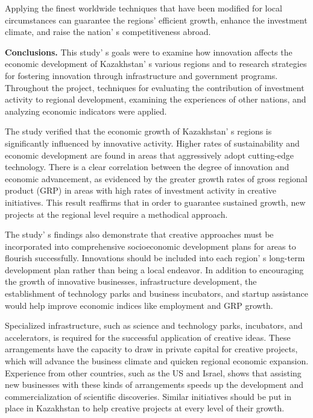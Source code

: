 \begin{multicols}{2}
Applying the finest worldwide techniques that have been modified for
local circumstances can guarantee the regions'{}
efficient growth, enhance the investment climate, and raise the
nation' s competitiveness abroad.

{\bfseries Conclusions.} This study' s goals were to examine
how innovation affects the economic development of
Kazakhstan' s various regions and to research strategies
for fostering innovation through infrastructure and government programs.
Throughout the project, techniques for evaluating the contribution of
investment activity to regional development, examining the experiences
of other nations, and analyzing economic indicators were applied.

The study verified that the economic growth of
Kazakhstan' s regions is significantly influenced by
innovative activity. Higher rates of sustainability and economic
development are found in areas that aggressively adopt cutting-edge
technology. There is a clear correlation between the degree of
innovation and economic advancement, as evidenced by the greater growth
rates of gross regional product (GRP) in areas with high rates of
investment activity in creative initiatives. This result reaffirms that
in order to guarantee sustained growth, new projects at the regional
level require a methodical approach.

The study' s findings also demonstrate that creative
approaches must be incorporated into comprehensive socioeconomic
development plans for areas to flourish successfully. Innovations should
be included into each region' s long-term development
plan rather than being a local endeavor. In addition to encouraging the
growth of innovative businesses, infrastructure development, the
establishment of technology parks and business incubators, and startup
assistance would help improve economic indices like employment and GRP
growth.

Specialized infrastructure, such as science and technology parks,
incubators, and accelerators, is required for the successful application
of creative ideas. These arrangements have the capacity to draw in
private capital for creative projects, which will advance the business
climate and quicken regional economic expansion. Experience from other
countries, such as the US and Israel, shows that assisting new
businesses with these kinds of arrangements speeds up the development
and commercialization of scientific discoveries. Similar initiatives
should be put in place in Kazakhstan to help creative projects at every
level of their growth.


\end{multicols}
